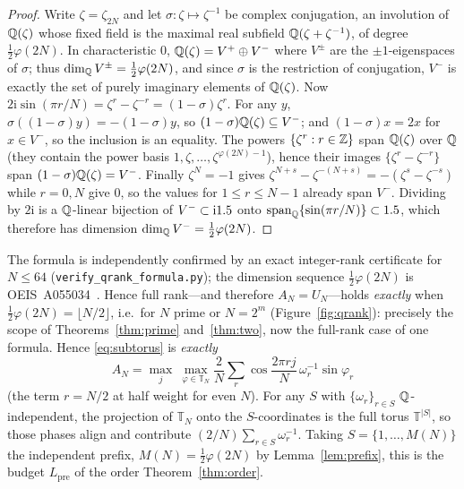 \begin{proof}
Write $\zeta=\zeta_{2N}$ and let $\sigma:\zeta\mapsto\zeta^{-1}$ be complex conjugation, an involution of
$\mathbb{Q}(\zeta)$ whose fixed field is the maximal real subfield $\mathbb{Q}(\zeta+\zeta^{-1})$, of degree
$\tfrac12\varphi(2N)$. In characteristic $0$, $\mathbb{Q}(\zeta)=V^+\oplus V^-$ where $V^\pm$ are the
$\pm1$-eigenspaces of $\sigma$; thus $\dim_{\mathbb{Q}} V^\pm=\tfrac12\varphi(2N)$, and since $\sigma$ is the
restriction of conjugation, $V^-$ is exactly the set of purely imaginary elements of $\mathbb{Q}(\zeta)$.
Now $2\mathrm i\sin(\pi r/N)=\zeta^r-\zeta^{-r}=(1-\sigma)\zeta^r$. For any $y$, $\sigma((1-\sigma)y)=
-(1-\sigma)y$, so $(1-\sigma)\mathbb{Q}(\zeta)\subseteq V^-$; and $(1-\sigma)x=2x$ for $x\in V^-$, so the inclusion
is an equality. The powers $\{\zeta^r:r\in\mathbb{Z}\}$ span $\mathbb{Q}(\zeta)$ over $\mathbb{Q}$ (they contain the power basis
$1,\zeta,\dots,\zeta^{\varphi(2N)-1}$), hence their images $\{\zeta^r-\zeta^{-r}\}$ span
$(1-\sigma)\mathbb{Q}(\zeta)=V^-$. Finally $\zeta^N=-1$ gives $\zeta^{N+s}-\zeta^{-(N+s)}=-(\zeta^s-\zeta^{-s})$
while $r=0,N$ give $0$, so the values for $1\le r\le N-1$ already span $V^-$. Dividing by $2\mathrm i$ is a
$\mathbb{Q}$-linear bijection of $V^-\subset\mathrm i1.5$ onto $\operatorname{span}_{\mathbb{Q}}\{\sin(\pi r/N)\}\subset1.5$,
which therefore has dimension $\dim_{\mathbb{Q}} V^-=\tfrac12\varphi(2N)$.
\end{proof}

\noindent The formula is independently confirmed by an exact integer-rank certificate for $N\le64$
(\texttt{verify\_qrank\_formula.py}); the dimension sequence $\tfrac12\varphi(2N)$ is
OEIS~A055034~\cite{OEIS}. Hence full rank---and therefore $A_N=U_N$---holds \emph{exactly}
when $\tfrac12\varphi(2N)=\lfloor N/2\rfloor$, i.e.\ for $N$ prime or $N=2^m$ (Figure~\ref{fig:qrank}):
precisely the scope of Theorems~\ref{thm:prime} and~\ref{thm:two}, now the full-rank case of one
formula. Hence \eqref{eq:subtorus} is \emph{exactly}
\[
  A_N=\max_j\ \max_{\varphi\in\mathbb{T}_N}\frac2N\sum_r\cos\frac{2\pi rj}{N}\,\omega_r^{-1}\sin\varphi_r
\]
(the term $r=N/2$ at half weight for even $N$).
For any $S$ with
$\{\omega_r\}_{r\in S}$ $\mathbb{Q}$-independent, the projection of $\mathbb{T}_N$ onto the $S$-coordinates is
the full torus $\mathbb{T}^{|S|}$, so those phases align and contribute $(2/N)\sum_{r\in S}\omega_r^{-1}$.
Taking $S=\{1,\dots,M(N)\}$ the independent prefix, $M(N)=\tfrac12\varphi(2N)$ by Lemma~\ref{lem:prefix},
this is the budget $L_{\mathrm{pre}}$ of the order Theorem~\ref{thm:order}.

